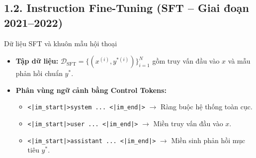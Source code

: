 \subsection{1.2. Instruction Fine-Tuning (SFT -- Giai đoạn 2021--2022)}

\begin{frame}{Dữ liệu SFT và khuôn mẫu hội thoại}
  \small
  \begin{itemize}\setlength{\itemsep}{4pt}
    \item \textbf{Tập dữ liệu:} $\mathcal{D}_{\text{SFT}} = \{(x^{(i)}, y^{*(i)})\}_{i=1}^{N}$ gồm truy vấn đầu vào $x$ và mẫu phản hồi chuẩn $y^*$.
    \item \textbf{Phân vùng ngữ cảnh bằng Control Tokens:}
      \begin{itemize}\small\setlength{\itemsep}{3pt}
        \item \texttt{<|im\_start|>system ... <|im\_end|>} $\longrightarrow$ Ràng buộc hệ thống toàn cục.
        \item \texttt{<|im\_start|>user ... <|im\_end|>} $\longrightarrow$ Miền truy vấn đầu vào $x$.
        \item \texttt{<|im\_start|>assistant ... <|im\_end|>} $\longrightarrow$ Miền sinh phản hồi mục tiêu $y^*$.
      \end{itemize}
  \end{itemize}
\end{frame}

